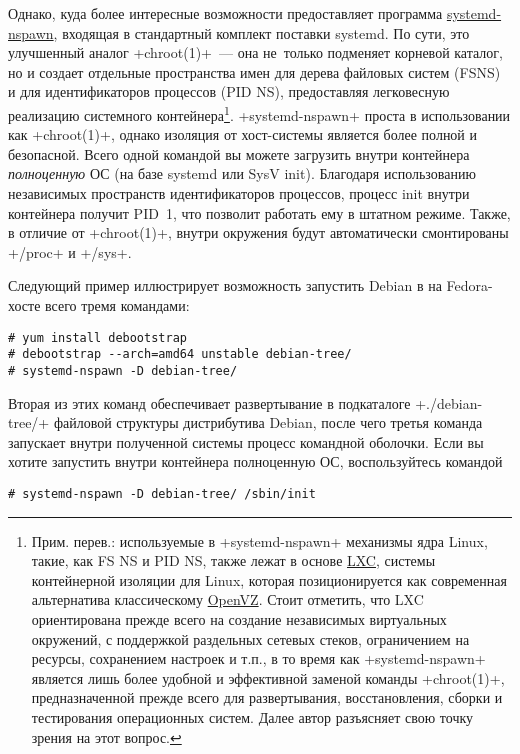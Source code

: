 \documentclass[10pt,oneside,a4paper]{article}
\begin{document}
Однако, куда более интересные возможности предоставляет программа
\href{http://0pointer.de/public/systemd-man/systemd-nspawn.html}{systemd-nspawn},
входящая в стандартный комплект поставки systemd. По сути, это улучшенный аналог
+chroot(1)+~--- она не~только подменяет корневой каталог, но и создает отдельные
пространства имен для дерева файловых систем (FSNS) и для идентификаторов
процессов (PID NS), предоставляя легковесную реализацию системного
контейнера\footnote{Прим. перев.: используемые в +systemd-nspawn+ механизмы 
ядра Linux, такие, как FS NS и PID NS, также лежат в основе
\href{http://lxc.sourceforge.net/}{LXC}, системы контейнерной изоляции для
Linux, которая позиционируется как современная альтернатива классическому
\href{http://wiki.openvz.org/Main_Page}{OpenVZ}. Стоит отметить, что LXC 
ориентирована прежде всего на создание независимых виртуальных окружений,
с поддержкой раздельных сетевых стеков, ограничением на ресурсы, сохранением
настроек и т.п., в то время как +systemd-nspawn+ является лишь более удобной и
эффективной заменой команды +chroot(1)+, предназначенной прежде всего для
развертывания, восстановления, сборки и тестирования операционных систем. Далее
автор разъясняет свою точку зрения на этот вопрос.}.
+systemd-nspawn+ проста в использовании как +chroot(1)+, однако изоляция
от хост-системы является более полной и безопасной. Всего одной командой
вы можете загрузить внутри контейнера \emph{полноценную} ОС (на базе systemd
или SysV init). Благодаря использованию независимых пространств идентификаторов
процессов, процесс init внутри контейнера получит PID~1, что позволит работать
ему в штатном режиме. Также, в отличие от +chroot(1)+, внутри окружения 
будут автоматически смонтированы +/proc+ и +/sys+.

Следующий пример иллюстрирует возможность запустить Debian в на Fedora-хосте
всего тремя командами:
\begin{Verbatim}
# yum install debootstrap
# debootstrap --arch=amd64 unstable debian-tree/
# systemd-nspawn -D debian-tree/
\end{Verbatim}

Вторая из этих команд обеспечивает развертывание в подкаталоге +./debian-tree/+
файловой структуры дистрибутива Debian, после чего третья команда запускает
внутри полученной системы процесс командной оболочки. Если вы хотите запустить
внутри контейнера полноценную ОС, воспользуйтесь командой
\begin{Verbatim}
# systemd-nspawn -D debian-tree/ /sbin/init
\end{Verbatim}
\end{document}
